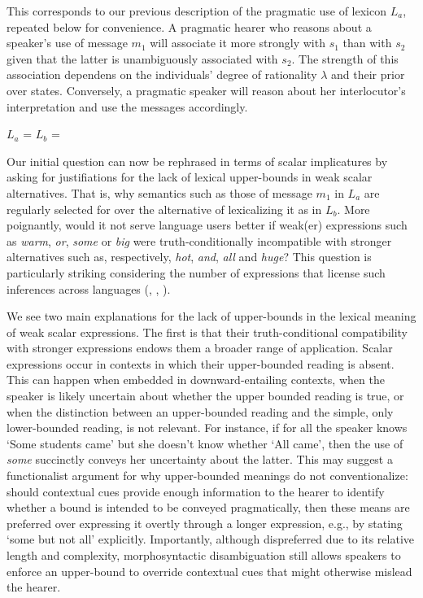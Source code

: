 \documentclass[a4paper]{article}
\begin{document}
This corresponds to our previous description of the pragmatic use of lexicon $L_a$, repeated below for convenience. A pragmatic hearer who reasons about a speaker's use of message $m_1$ will associate it more strongly with $s_1$ than with $s_2$ given that the latter is unambiguously associated with $s_2$. The strength of this association dependens on the individuals' degree of rationality $\lambda$ and their prior over states. Conversely, a pragmatic speaker will reason about her interlocutor's interpretation and use the messages accordingly. 

\begin{centering}
$L_a$ =  \hspace{2cm} $L_b$ = \\[0.5cm]
\end{centering}

Our initial question can now be rephrased in terms of scalar implicatures by asking for justifiations for the lack of lexical upper-bounds in weak scalar alternatives. That is, why semantics such as those of message $m_1$ in $L_a$ are regularly selected for over the alternative of lexicalizing it as in $L_b$. More poignantly, would it not serve language users better if weak(er) expressions such as {\em warm}, {\em or}, {\em some} or {\em big} were truth-conditionally incompatible with stronger alternatives such as, respectively, {\em hot}, {\em and}, {\em all} and {\em huge}?  This question is particularly striking considering the number of expressions that license such inferences across languages (\citealt{horn:1972}, \citealt[252-267]{horn:1984}, \citealt{traugott:2004,vdAuwera:2010}). 

We see two main explanations for the lack of upper-bounds in the lexical meaning of weak scalar expressions. The first is that their truth-conditional compatibility with stronger expressions endows them a broader range of application. Scalar expressions occur in contexts in which their upper-bounded reading is absent. This can happen when embedded in downward-entailing contexts, when the speaker is likely uncertain about whether the upper bounded reading is true, or when the distinction between an upper-bounded reading and the simple, only lower-bounded reading, is not relevant. For instance, if for all the speaker knows `Some students came' but she doesn't know whether `All came', then the use of {\em some} succinctly conveys her uncertainty about the latter. This may suggest a functionalist argument for why upper-bounded meanings do not conventionalize: should contextual cues provide enough information to the hearer to identify whether a bound is intended to be conveyed pragmatically, then these means are preferred over expressing it overtly through a longer expression, e.g., by stating `some but not all' explicitly. Importantly, although dispreferred due to its relative length and complexity, morphosyntactic disambiguation still allows speakers to enforce an upper-bound to override contextual cues that might otherwise mislead the hearer. 
\end{document}
